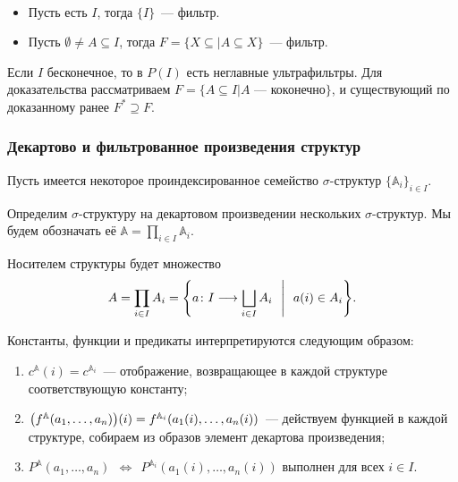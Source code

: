 \begin{exmpl} \ 
    \begin{itemize}
        \item Пусть есть $I$, тогда $\{I\}$~— фильтр. 
        \item Пусть $\emptyset \neq A \subseteq I$, тогда $F = \{X \subseteq | A \subseteq X\}$~— фильтр.
    \end{itemize}
\end{exmpl}

\begin{task}
    Если $I$ бесконечное, то в $P(I)$ есть неглавные ультрафильтры. Для доказательства рассматриваем $F = \{A \subseteq I | A\text{~— коконечно}\}$, и существующий по доказанному ранее $F^* \supseteq F$. 
\end{task} 

\subsubsection{Декартово и фильтрованное произведения структур} 

Пусть имеется некоторое проиндексированное семейство $\sigma$-структур $\{\mathbb{A}_i\}_{i \in I}$.

\begin{definition}
	Определим \(\sigma\)-структуру на декартовом произведении нескольких \(\sigma\)-структур. Мы будем обозначать её \(\mathbb{A} = \prod_{i \in I} \mathbb{A}_i\).
    
	Носителем структуры будет множество
	   \[ A = \prod\limits_{i \in I} A_i =
	      \set*{a \colon I \longrightarrow \bigsqcup\limits_{i \in I} A_i
	      \ \ \middle\vert\ \ a(i) \in A_i}.\]

	Константы, функции и предикаты интерпретируются следующим образом:
   \begin{enumerate}
	\item \(c^{\mathbb{A}}(i) = c^{\mathbb{A}_i}\)~— отображение, возвращающее в каждой структуре соответствующую константу;
	\item \( \lr*{f^{\mathbb{A}}(a_1, \ldots, a_n)}(i) =
	          f^{\mathbb{A}_i}(a_1(i), \ldots, a_n(i)) \)~— действуем функцией в каждой структуре, собираем из образов элемент декартова произведения;
	\item \(P^{\mathbb{A}}(a_1, \ldots, a_n)\ \ \Longleftrightarrow\ \ 
	        P^{\mathbb{A}_i}(a_1(i), \ldots, a_n(i))\text{\ выполнен для всех\ }i \in I\).
   \end{enumerate}
\end{definition}

